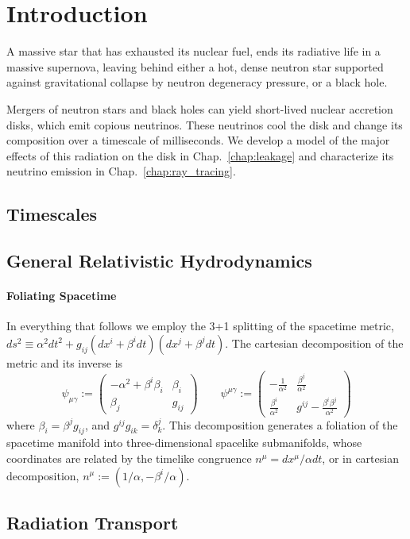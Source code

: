 \chapter{Introduction}
\label{chap:intro}

A massive star that has exhausted its nuclear fuel, ends its radiative life
in a massive supernova, leaving behind either a hot, dense neutron star supported
against gravitational collapse by neutron degeneracy pressure, or a black hole.

Mergers of neutron stars and black holes can yield short-lived nuclear accretion
disks, which emit copious neutrinos. These neutrinos cool the disk and change
its composition over a timescale of milliseconds. We develop a model of the
major effects of this radiation on the disk in Chap.~\ref{chap:leakage}
\citep{deat2013-leakage} and characterize its neutrino emission in
Chap.~\ref{chap:ray_tracing}.



\section{Timescales}

\section{General Relativistic Hydrodynamics}

\subsubsection{Foliating Spacetime}
\label{ssec:adm_metric}
In everything that follows we employ the 3+1 splitting of the spacetime metric,
$ds^2 \equiv \alpha^2dt^2 + g_{ij}(dx^i+\beta^idt)(dx^j+\beta^jdt)$.
The cartesian decomposition of the metric and its inverse is
\begin{equation}
  \psi_{\mu\gamma} :=
  \left(
  \begin{matrix}
    -\alpha^2 + \beta^i \beta_i  & \beta_i \\
    \beta_j                      & g_{ij}
  \end{matrix}
  \right)
  \qquad
  \psi^{\mu\gamma} :=
  \left(
  \begin{matrix}
    -\frac{1}{\alpha^2}          & \frac{\beta^j}{\alpha^2} \\
    \frac{\beta^i}{\alpha^2}     & g^{ij} - \frac{\beta^i \beta^j}{\alpha^2}
  \end{matrix}
  \right)
\end{equation}
where $\beta_i=\beta^j g_{ij}$, and $g^{ij}g_{ik}=\delta^{j}_{k}$.
This decomposition generates a foliation of the spacetime manifold into
three-dimensional spacelike submanifolds, whose coordinates are related
by the timelike congruence $n^\mu=dx^\mu/\alpha dt$, or in cartesian
decomposition, $n^\mu:=(1/\alpha,-\beta^i/\alpha)$.

\section{Radiation Transport}
